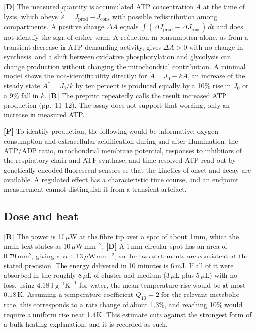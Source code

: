 \documentclass[11pt]{article}
\newcommand{\stR}{\textbf{\textcolor{blue!55!black}{[R]}}}
\newcommand{\stD}{\textbf{\textcolor{green!40!black}{[D]}}}
\newcommand{\stP}{\textbf{\textcolor{violet!80!black}{[P]}}}
\theoremstyle{plain}
\theoremstyle{definition}
\theoremstyle{remark}
\begin{document}
\stD{} The measured quantity is accumulated ATP concentration $A$ at the time of lysis, which obeys $\dot A=J_{\mathrm{prod}}-J_{\mathrm{cons}}$ with possible redistribution among compartments. A positive change $\Delta A$ equals $\int(\Delta J_{\mathrm{prod}}-\Delta J_{\mathrm{cons}})\,dt$ and does not identify the sign of either term. A reduction in consumption alone, as from a transient decrease in ATP-demanding activity, gives $\Delta A>0$ with no change in synthesis, and a shift between oxidative phosphorylation and glycolysis can change production without changing the mitochondrial contribution. A minimal model shows the non-identifiability directly: for $\dot A=J_0-kA$, an increase of the steady state $A^*=J_0/k$ by ten percent is produced equally by a 10\% rise in $J_0$ or a 9\% fall in $k$. \stR{} The preprint repeatedly calls the result increased ATP production (pp.~11--12). The assay does not support that wording, only an increase in measured ATP.

\stP{} To identify production, the following would be informative: oxygen consumption and extracellular acidification during and after illumination, the ATP/ADP ratio, mitochondrial membrane potential, responses to inhibitors of the respiratory chain and ATP synthase, and time-resolved ATP read out by genetically encoded fluorescent sensors so that the kinetics of onset and decay are available. A regulated effect has a characteristic time course, and an endpoint measurement cannot distinguish it from a transient artefact.

\subsection{Dose and heat}

\stR{} The power is 10\,$\mu$W at the fibre tip over a spot of about 1\,mm, which the main text states as $10\,\mu\mathrm{W\,mm^{-2}}$. \stD{} A 1\,mm circular spot has an area of $0.79\,\mathrm{mm}^2$, giving about $13\,\mu\mathrm{W\,mm^{-2}}$, so the two statements are consistent at the stated precision. The energy delivered in 10 minutes is 6\,mJ. If all of it were absorbed in the roughly $8\,\mu\mathrm{L}$ of cluster and medium (3\,$\mu$L plus 5\,$\mu$L) with no loss, using $4.18\,\mathrm{J\,g^{-1}K^{-1}}$ for water, the mean temperature rise would be at most $0.18\,\mathrm{K}$. Assuming a temperature coefficient $Q_{10}=2$ for the relevant metabolic rate, this corresponds to a rate change of about 1.3\%, and reaching 10\% would require a uniform rise near 1.4\,K. This estimate cuts against the strongest form of a bulk-heating explanation, and it is recorded as such.
\end{document}
